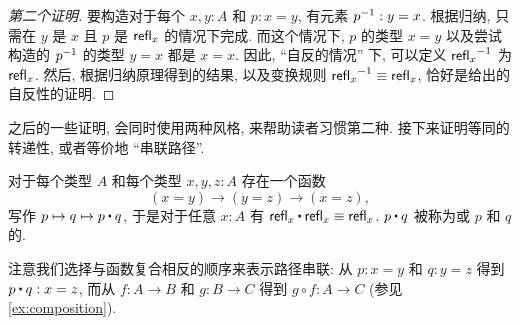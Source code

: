 \begin{proof}[第二个证明]
    要构造对于每个 $x,y:A$ 和 $p:x=y$, 有元素 $\mathord{{p}^{-1}}:y=x$.
    根据归纳, 只需在 $y$ 是 $x$ 且 $p$ 是 $\mathsf{refl}_{x}$ 的情况下完成.
    而这个情况下, $p$ 的类型 $x=y$ 以及尝试构造的 $\mathord{{p}^{-1}}$ 的类型 $y=x$ 都是 $x=x$.
    因此, ``自反的情况'' 下, 可以定义 $\mathord{{\mathsf{refl}_{x}}^{-1}}$ 为 $\mathsf{refl}_{x}$.
    然后, 根据归纳原理得到的结果, 以及变换规则 $\mathord{{\mathsf{refl}_{x}}^{-1}}\equiv\mathsf{refl}_{x}$, 恰好是给出的自反性的证明.
\end{proof}

之后的一些证明, 会同时使用两种风格, 来帮助读者习惯第二种.
接下来证明等同的转递性, 或者等价地 ``串联路径''.

\begin{lem}
    \label{lem:concat}
    对于每个类型 $A$ 和每个类型 $x,y,z:A$ 存在一个函数
    \begin{equation*}
    (x= y)
        \to (y= z)\to (x= z),
    \end{equation*}
    写作 $p \mapsto q \mapsto p\ct q$, 于是对于任意 $x:A$ 有 $\refl{x}\ct \refl{x}\jdeq \refl{x}$.
    $p\ct q$ 被称为或 $p$ 和 $q$ 的.
\end{lem}

注意我们选择与函数复合相反的顺序来表示路径串联: 从 $p:x=y$ 和 $q:y=z$ 得到 $p\ct q : x=z$, 而从 $f:A\to B$ 和 $g:B\to C$ 得到 $g\circ f : A\to C$ (参见 \cref{ex:composition}).

